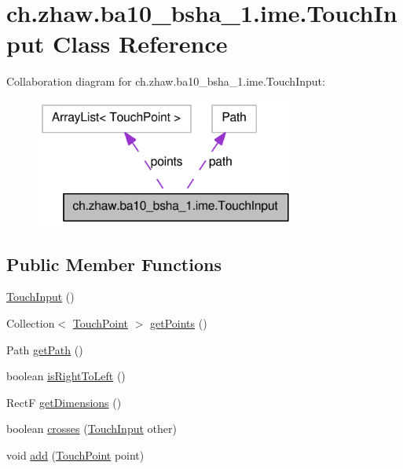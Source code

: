 \hypertarget{classch_1_1zhaw_1_1ba10__bsha__1_1_1ime_1_1TouchInput}{
\section{ch.zhaw.ba10\_\-bsha\_\-1.ime.TouchInput Class Reference}
\label{classch_1_1zhaw_1_1ba10__bsha__1_1_1ime_1_1TouchInput}
}
Collaboration diagram for ch.zhaw.ba10\_\-bsha\_\-1.ime.TouchInput:\nopagebreak
\begin{figure}[H]
\begin{center}
\leavevmode
\includegraphics[width=243pt]{classch_1_1zhaw_1_1ba10__bsha__1_1_1ime_1_1TouchInput__coll__graph}
\end{center}
\end{figure}
\subsection*{Public Member Functions}
\begin{DoxyCompactItemize}
\item 
\hyperlink{classch_1_1zhaw_1_1ba10__bsha__1_1_1ime_1_1TouchInput_a35e5a2dafdadf1379ce628ff01dec0f6}{TouchInput} ()
\item 
Collection$<$ \hyperlink{classch_1_1zhaw_1_1ba10__bsha__1_1_1TouchPoint}{TouchPoint} $>$ \hyperlink{classch_1_1zhaw_1_1ba10__bsha__1_1_1ime_1_1TouchInput_a12f25294b93d8e24ab3186f2c3e8e1b9}{getPoints} ()
\item 
Path \hyperlink{classch_1_1zhaw_1_1ba10__bsha__1_1_1ime_1_1TouchInput_a109b88f906f350c5d4c25abc5fd6f95e}{getPath} ()
\item 
boolean \hyperlink{classch_1_1zhaw_1_1ba10__bsha__1_1_1ime_1_1TouchInput_a128099435135aeaa5d2aac9901b3ec3a}{isRightToLeft} ()
\item 
RectF \hyperlink{classch_1_1zhaw_1_1ba10__bsha__1_1_1ime_1_1TouchInput_ac68086768e724f1c1847b31dca3cc851}{getDimensions} ()
\item 
boolean \hyperlink{classch_1_1zhaw_1_1ba10__bsha__1_1_1ime_1_1TouchInput_adb0a9fe73a2091ae7c3bdebe40be8a25}{crosses} (\hyperlink{classch_1_1zhaw_1_1ba10__bsha__1_1_1ime_1_1TouchInput}{TouchInput} other)
\item 
void \hyperlink{classch_1_1zhaw_1_1ba10__bsha__1_1_1ime_1_1TouchInput_a658d320b9d5c19adcbcd583476ef59e1}{add} (\hyperlink{classch_1_1zhaw_1_1ba10__bsha__1_1_1TouchPoint}{TouchPoint} point)
\end{DoxyCompactItemize}

